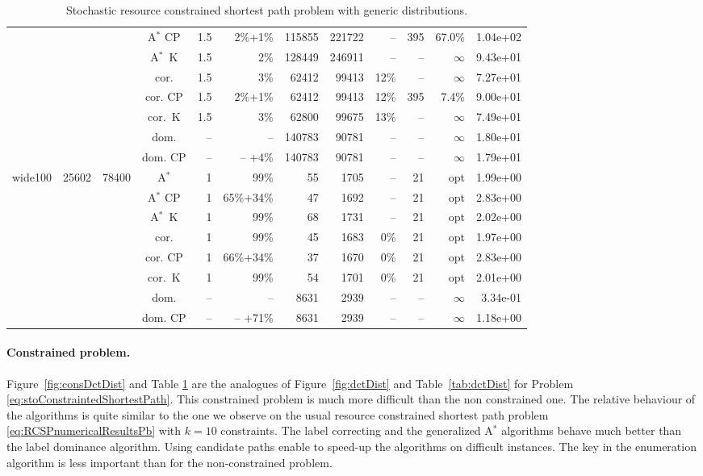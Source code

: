 \documentclass[11pt]{amsart}
\newenvironment{outdent}
{\begin{list}{}{\leftmargin-2cm\rightmargin\leftmargin}\centering\item\relax}
{\end{list}\ignorespacesafterend}
\theoremstyle{plain}
\theoremstyle{remark}
\begin{document}
\begin{table}
\begin{outdent}
\begin{small}
\begin{tabular}{|l|rrc|rr|rrr|rr|r|}
&&&A$^*$ CP & 1.5 & 2\%+1\% &115855 & 221722 & -- &395 & 67.0\% & 1.04e+02 \\
&&&A$^*$~K & 1.5 & 2\% &128449 & 246911 & -- & -- &$\infty$ & 9.43e+01 \\
&&&cor. & 1.5 & 3\% &62412 & 99413 & 12\% & -- &$\infty$ & 7.27e+01 \\
&&&cor. CP & 1.5 & 2\%+1\% &62412 & 99413 & 12\% &395 & 7.4\% & 9.00e+01 \\
&&&cor.~K & 1.5 & 3\% &62800 & 99675 & 13\% & -- &$\infty$ & 7.49e+01 \\
&&&dom. & -- & --  &140783 & 90781 & -- & -- &$\infty$ & 1.80e+01 \\
&&&dom. CP & -- & -- +4\% &140783 & 90781 & -- & -- &$\infty$ & 1.79e+01 \\
\hline
wide100 & 25602 & 78400 & A$^*$ & 1 & 99\% &55 & 1705 & -- &21 & opt & 1.99e+00 \\
&&&A$^*$ CP & 1 & 65\%+34\% &47 & 1692 & -- &21 & opt & 2.83e+00 \\
&&&A$^*$~K & 1 & 99\% &68 & 1731 & -- &21 & opt & 2.02e+00 \\
&&&cor. & 1 & 99\% &45 & 1683 & 0\% &21 & opt & 1.97e+00 \\
&&&cor. CP & 1 & 66\%+34\% &37 & 1670 & 0\% &21 & opt & 2.83e+00 \\
&&&cor.~K & 1 & 99\% &54 & 1701 & 0\% &21 & opt & 2.01e+00 \\
&&&dom. & -- & --  &8631 & 2939 & -- & -- &$\infty$ & 3.34e-01 \\
&&&dom. CP & -- & -- +71\% &8631 & 2939 & -- & -- &$\infty$ & 1.18e+00 \\
\hline
\end{tabular}
\end{small}
\end{outdent}
\caption{Stochastic resource constrained shortest path problem with generic distributions.}
\label{tab:consDctDist}
\end{table}

\paragraph{Constrained problem.}
Figure~\ref{fig:consDctDist} and Table \ref{tab:consDctDist} are the analogues of Figure~\ref{fig:dctDist} and Table~\ref{tab:dctDist} for Problem \eqref{eq:stoConstraintedShortestPath}. This constrained problem is much more difficult than the non constrained one. The relative behaviour of the algorithms is quite similar to the one we observe on the usual resource constrained shortest path problem \eqref{eq:RCSPnumericalResultsPb} with $k=10$ constraints. The label correcting and the generalized A$^{*}$ algorithms behave much better than the label dominance algorithm. Using candidate paths enable to speed-up the algorithms on difficult instances. The key in the enumeration algorithm is less important than for the non-constrained problem.
\end{document}
